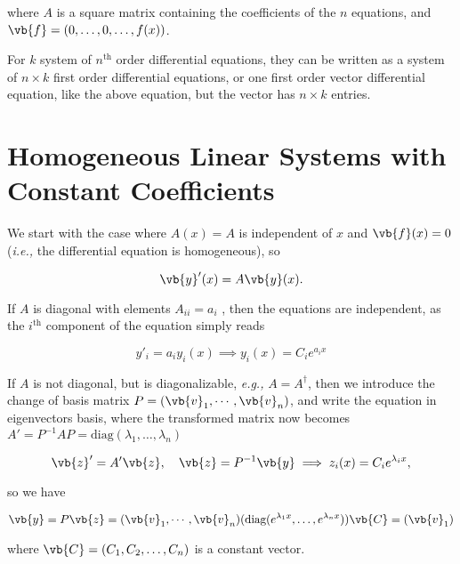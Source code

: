 \documentclass[english,a4paper,12pt]{report}
\begin{document}
where \(A\) is a square matrix containing the coefficients of the \(n\) equations, and \(\vb{f} = (0,\ldots ,0,\ldots ,f(x))\).

For \(k\) system of \(n^{\text{th}} \) order differential equations, they can be written as a system of \(n \times k\) first order differential equations, or one first order vector differential equation, like the above equation, but the vector has \(n \times k\) entries.   

\section{Homogeneous Linear Systems with Constant Coefficients} \label{homosys} 

We start with the case where \(A(x) = A\) is independent of \(x\) and \(\vb{f} (x) = 0\) (\textit{i.e.,} the differential equation is homogeneous), so

\begin{equation}
    \vb{y}'(x) = A \vb{y}(x).  
\end{equation}

If \(A\) is diagonal with elements \(A_{ii} = a_{i}\) , then the equations are independent, as the \(i^{\text{th}} \) component of the equation simply reads

\begin{equation}
    y'_{i} = a_{i} y_{i}(x) \implies y_{i} (x) = C_{i}e^{a_{i}x }    
\end{equation}

If \(A\) is not diagonal, but is diagonalizable, \textit{e.g.,} \(A = A^{\dagger} \), then we introduce the change of basis matrix \(P = (\vb{v} _1, \cdots, \vb{v} _n )\), and write the equation in eigenvectors basis, where the transformed matrix now becomes \(A' = P^{-1} AP = \text{diag}(\lambda _{1}, \ldots , \lambda _{n}  )\) 

\begin{equation}
    \vb{z}' = A' \vb{z}, \quad  \vb{z} = P^{-1} \vb{y} \implies z_{i}(x) = C_{i}e^{\lambda _{i}x },  
\end{equation}

so we have

\begin{equation}  \label{homovec} 
    \vb{y} = P \vb{z} = (\vb{v}_1, \cdots, \vb{v} _n ) (\text{diag}(e^{\lambda _{1}x }, \ldots , e^{\lambda _{n}x }  ))\vb{C} = (\vb{v}_{1}  )
\end{equation}

where \(\vb{C} = (C_1 ,C_2 ,\ldots ,C_{n} )\) is a constant vector.
\end{document}
